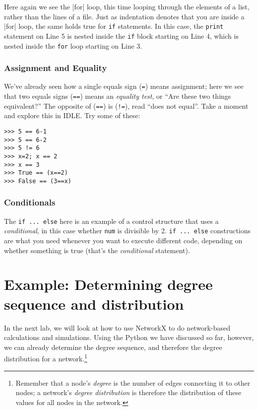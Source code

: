 \documentclass{article}
\begin{document}
Here again we see the |for| loop, this time looping through the elements of a list, rather than the lines of a file.  Just as indentation denotes that you 
are inside a |for| loop, the same holds true for \texttt{if} statements.  In this case, the \texttt{print} statement on Line 5 is nested inside 
the \texttt{if} block starting on Line 4, which is nested inside the \texttt{for} loop starting on Line 3.

\subsubsection*{Assignment and Equality}
We've already seen how a single equals sign (\texttt{=}) means assignment; here
we see that two equals signs (\texttt{==}) means an \textit{equality test}, or
``Are these two things equivalent?''  The opposite of (\texttt{==}) is
(\texttt{!=}), read ``does not equal''.  Take a moment and explore this in IDLE.
 Try some of these:

\begin{Verbatim}
>>> 5 == 6-1
>>> 5 == 6-2
>>> 5 != 6
>>> x=2; x == 2
>>> x == 3
>>> True == (x==2)
>>> False == (3==x)
\end{Verbatim}

\subsubsection*{Conditionals}
The \texttt{if ... else} here is an example of a control structure that uses a \textit{conditional}, in this case whether \texttt{num} is divisible by
2.  \texttt{if ... else} constructions are what you need whenever you want to execute different code, depending on whether something is true (that's the
\textit{conditional} statement).

\section{Example: Determining degree sequence and distribution}
\label{deg_seq}
In the next lab, we will look at how to use NetworkX to do network-based calculations and simulations.  Using the Python we have discussed so far,
however, we can already determine the degree sequence, and therefore the degree distribution for a network.\footnote{Remember that a node's \textit{degree}
 is the number of edges connecting it to other nodes; a network's \textit{degree distribution} is therefore the distribution of these values for
 all nodes in the network.}
\end{document}
